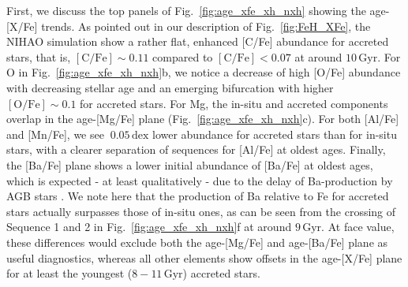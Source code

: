 \documentclass[fleqn,usenatbib]{mnras}
\begin{document}
First, we discuss the top panels of Fig.~\ref{fig:age_xfe_xh_nxh} showing the age-[X/Fe] trends. As pointed out in our description of Fig.~\ref{fig:FeH_XFe}, the NIHAO simulation show a rather flat, enhanced [C/Fe] abundance for accreted stars, that is, $\mathrm{[C/Fe]} \sim 0.11$ compared to  $\mathrm{[C/Fe]} < 0.07$ at around $10\,\mathrm{Gyr}$. For O in Fig.~\ref{fig:age_xfe_xh_nxh}b, we notice a decrease of high [O/Fe] abundance with decreasing stellar age and an emerging bifurcation with higher $\mathrm{[O/Fe]} \sim 0.1$ for accreted stars. For Mg, the in-situ and accreted components overlap in the age-[Mg/Fe] plane (Fig.~\ref{fig:age_xfe_xh_nxh}c). For both [Al/Fe] and [Mn/Fe], we see $~0.05\,\mathrm{dex}$ lower abundance for accreted stars than for in-situ stars, with a clearer separation of sequences for [Al/Fe] at oldest ages. Finally, the [Ba/Fe] plane shows a lower initial abundance of [Ba/Fe] at oldest ages, which is expected - at least qualitatively - due to the delay of Ba-production by AGB stars \citep{Karakas2016}. We note here that the production of Ba relative to Fe for accreted stars actually surpasses those of in-situ ones, as can be seen from the crossing of Sequence 1 and 2 in Fig.~\ref{fig:age_xfe_xh_nxh}f at around $9\,\mathrm{Gyr}$. At face value, these differences would exclude both the age-[Mg/Fe] and age-[Ba/Fe] plane as useful diagnostics, whereas all other elements show offsets in the age-[X/Fe] plane for at least the youngest ($8-11\,\mathrm{Gyr}$) accreted stars.
\end{document}
